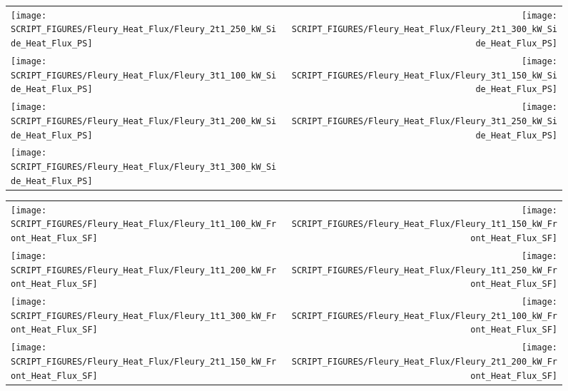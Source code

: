 \begin{figure}[p]
\begin{tabular*}{\textwidth}{l@{\extracolsep{\fill}}r}
\texttt{[image: SCRIPT\_FIGURES/Fleury\_Heat\_Flux/Fleury\_2t1\_250\_kW\_Side\_Heat\_Flux\_PS]} &
\texttt{[image: SCRIPT\_FIGURES/Fleury\_Heat\_Flux/Fleury\_2t1\_300\_kW\_Side\_Heat\_Flux\_PS]} \\
\texttt{[image: SCRIPT\_FIGURES/Fleury\_Heat\_Flux/Fleury\_3t1\_100\_kW\_Side\_Heat\_Flux\_PS]} &
\texttt{[image: SCRIPT\_FIGURES/Fleury\_Heat\_Flux/Fleury\_3t1\_150\_kW\_Side\_Heat\_Flux\_PS]} \\
\texttt{[image: SCRIPT\_FIGURES/Fleury\_Heat\_Flux/Fleury\_3t1\_200\_kW\_Side\_Heat\_Flux\_PS]} &
\texttt{[image: SCRIPT\_FIGURES/Fleury\_Heat\_Flux/Fleury\_3t1\_250\_kW\_Side\_Heat\_Flux\_PS]} \\
\texttt{[image: SCRIPT\_FIGURES/Fleury\_Heat\_Flux/Fleury\_3t1\_300\_kW\_Side\_Heat\_Flux\_PS]}
\end{tabular*}
\end{figure}

\begin{figure}[p]
\begin{tabular*}{\textwidth}{l@{\extracolsep{\fill}}r}
\texttt{[image: SCRIPT\_FIGURES/Fleury\_Heat\_Flux/Fleury\_1t1\_100\_kW\_Front\_Heat\_Flux\_SF]} &
\texttt{[image: SCRIPT\_FIGURES/Fleury\_Heat\_Flux/Fleury\_1t1\_150\_kW\_Front\_Heat\_Flux\_SF]} \\
\texttt{[image: SCRIPT\_FIGURES/Fleury\_Heat\_Flux/Fleury\_1t1\_200\_kW\_Front\_Heat\_Flux\_SF]} &
\texttt{[image: SCRIPT\_FIGURES/Fleury\_Heat\_Flux/Fleury\_1t1\_250\_kW\_Front\_Heat\_Flux\_SF]} \\
\texttt{[image: SCRIPT\_FIGURES/Fleury\_Heat\_Flux/Fleury\_1t1\_300\_kW\_Front\_Heat\_Flux\_SF]} &
\texttt{[image: SCRIPT\_FIGURES/Fleury\_Heat\_Flux/Fleury\_2t1\_100\_kW\_Front\_Heat\_Flux\_SF]} \\
\texttt{[image: SCRIPT\_FIGURES/Fleury\_Heat\_Flux/Fleury\_2t1\_150\_kW\_Front\_Heat\_Flux\_SF]} &
\texttt{[image: SCRIPT\_FIGURES/Fleury\_Heat\_Flux/Fleury\_2t1\_200\_kW\_Front\_Heat\_Flux\_SF]}
\end{tabular*}
\end{figure}

